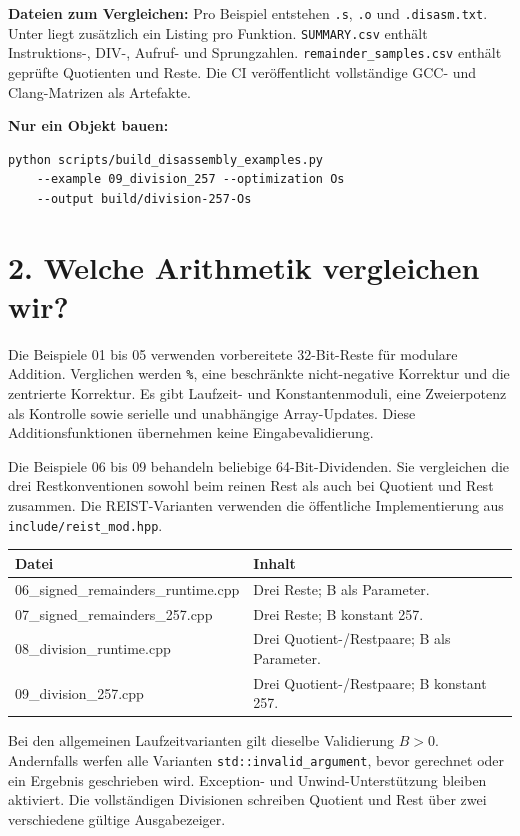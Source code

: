 \documentclass[11pt,a4paper]{article}
\begin{document}
\textbf{Dateien zum Vergleichen:}
Pro Beispiel entstehen \texttt{.s}, \texttt{.o} und \texttt{.disasm.txt}.
Unter  liegt zusätzlich ein Listing pro Funktion.
\texttt{SUMMARY.csv} enthält Instruktions-, DIV-, Aufruf- und Sprungzahlen.
\texttt{remainder\_samples.csv} enthält geprüfte Quotienten und Reste.
Die CI veröffentlicht vollständige GCC- und Clang-Matrizen als Artefakte.

\textbf{Nur ein Objekt bauen:}
\begin{lstlisting}
python scripts/build_disassembly_examples.py
    --example 09_division_257 --optimization Os
    --output build/division-257-Os
\end{lstlisting}

\newpage
\section*{2. Welche Arithmetik vergleichen wir?}
Die Beispiele 01 bis 05 verwenden vorbereitete 32-Bit-Reste für modulare
Addition. Verglichen werden \texttt{\%}, eine beschränkte nicht-negative
Korrektur und die zentrierte Korrektur. Es gibt Laufzeit- und Konstantenmoduli,
eine Zweierpotenz als Kontrolle sowie serielle und unabhängige Array-Updates.
Diese Additionsfunktionen übernehmen keine Eingabevalidierung.

Die Beispiele 06 bis 09 behandeln beliebige 64-Bit-Dividenden. Sie vergleichen
die drei Restkonventionen sowohl beim reinen Rest als auch bei Quotient und
Rest zusammen. Die REIST-Varianten verwenden die öffentliche Implementierung
aus \texttt{include/reist\_mod.hpp}.

\begin{tabularx}{\linewidth}{@{}lX@{}}
\toprule
Datei & Inhalt \\
\midrule
06\_signed\_remainders\_runtime.cpp & Drei Reste; B als Parameter. \\
07\_signed\_remainders\_257.cpp & Drei Reste; B konstant 257. \\
08\_division\_runtime.cpp & Drei Quotient-/Restpaare; B als Parameter. \\
09\_division\_257.cpp & Drei Quotient-/Restpaare; B konstant 257. \\
\bottomrule
\end{tabularx}

Bei den allgemeinen Laufzeitvarianten gilt dieselbe Validierung $B>0$.
Andernfalls werfen alle Varianten \texttt{std::invalid\_argument}, bevor
gerechnet oder ein Ergebnis geschrieben wird. Exception- und
Unwind-Unterstützung bleiben aktiviert. Die vollständigen Divisionen schreiben
Quotient und Rest über zwei verschiedene gültige Ausgabezeiger.
\end{document}

